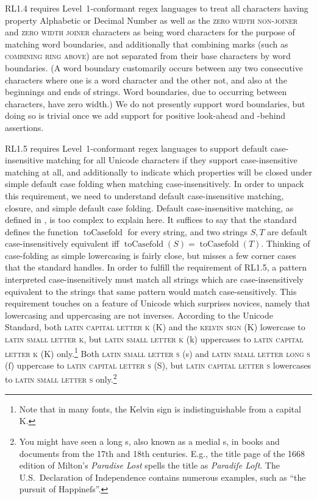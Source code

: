 \documentclass[5p,final,number,sort&compress]{elsarticle}
\begin{document}
RL1.4 requires Level~1-conformant regex languages to treat all characters having property Alphabetic or Decimal Number as well as the \textsc{zero width non-joiner} and \textsc{zero width joiner} characters as being word characters for the purpose of matching word boundaries, and additionally that combining marks (such as \textsc{combining ring above}) are not separated from their base characters by word boundaries. (A word boundary customarily occurs between any two consecutive characters where one is a word character and the other not, and also at the beginnings and ends of strings. Word boundaries, due to occurring between characters, have zero width.) We do not presently support word boundaries, but doing so is trivial once we add support for positive look-ahead and -behind assertions.

RL1.5 requires Level~1-conformant regex languages to support default case-insensitive matching for all Unicode characters if they support case-insensitive matching at all, and additionally to indicate which properties will be closed under simple default case folding when matching case-insensitively. In order to unpack this requirement, we need to understand default case-insensitive matching, closure, and simple default case folding. Default case-insensitive matching, as defined in \citep[\S 3.1.3]{ustd62}, is too complex to explain here. It suffices to say that the standard defines the function $\operatorname{toCasefold}$ for every string, and two strings $S,T$ are default case-insensitively equivalent iff $\operatorname{toCasefold}(S) = \operatorname{toCasefold}(T)$. Thinking of case-folding as simple lowercasing is fairly close, but misses a few corner cases that the standard handles. In order to fulfill the requirement of RL1.5, a pattern interpreted case-insensitively must match all strings which are case-insensitively equivalent to the strings that same pattern would match case-sensitively. This requirement touches on a feature of Unicode which surprises novices, namely that lowercasing and uppercasing are not inverses. According to the Unicode Standard, both \textsc{latin capital letter k} (K) and the \textsc{kelvin sign} (K)
lowercase to \textsc{latin small letter k}, but \textsc{latin small letter k} (k) uppercases to \textsc{latin capital letter k} (K) only.\footnote{Note that in many fonts, the Kelvin sign is indistinguishable from a capital K.} Both \textsc{latin small letter s} (s) and \textsc{latin small letter long s} (ſ) uppercase to \textsc{latin capital letter s} (S), but \textsc{latin capital letter s} lowercases to \textsc{latin small letter s} only.\footnote{You might have seen a long s, also known as a medial s, in books and documents from the 17th and 18th centuries. E.g., the title page of the 1668 edition of Milton's \emph{Paradise Lost} spells the title as \emph{Paradiſe Loſt}. The U.S.\ Declaration of Independence contains numerous examples, such as ``the pursuit of Happineſs''.}
\end{document}
